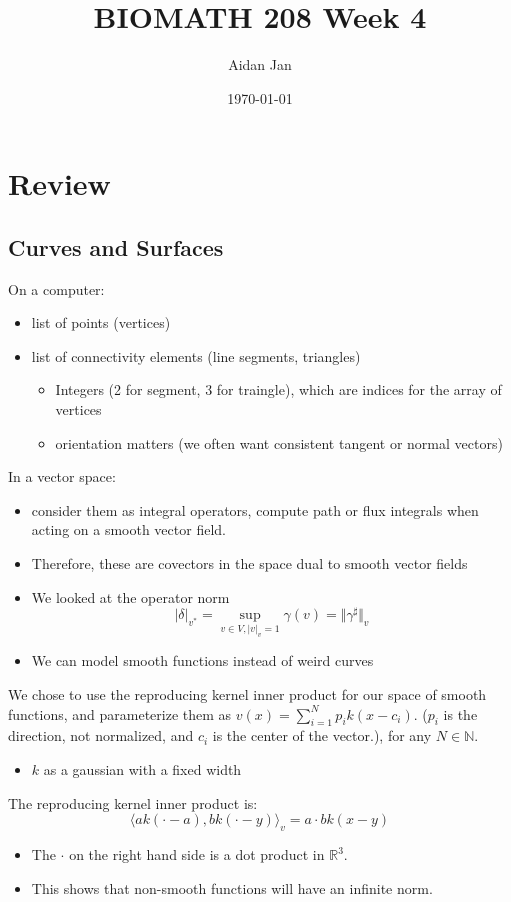 \documentclass[10pt]{article}
\title{BIOMATH 208 Week 4}
\author{Aidan Jan}
\date{\today}
\begin{document}
\maketitle
\section*{Review}
\subsection*{Curves and Surfaces}
On a computer:
\begin{itemize}
    \item list of points (vertices)
    \item list of connectivity elements (line segments, triangles)
    \begin{itemize}
        \item Integers (2 for segment, 3 for traingle), which are indices for the array of vertices
        \item orientation matters (we often want consistent tangent or normal vectors)
    \end{itemize}
\end{itemize}
In a vector space:
\begin{itemize}
    \item consider them as integral operators, compute path or flux integrals when acting on a smooth vector field.
    \item Therefore, these are covectors in the space dual to smooth vector fields
    \item We looked at the operator norm 
    \[|\delta|_{v^*} = \sup_{v \in V, |v|_v = 1} \gamma(v) = \Vert \gamma^\sharp \Vert_v\]    
    \item We can model smooth functions instead of weird curves
\end{itemize}
We chose to use the reproducing kernel inner product for our space of smooth functions, and parameterize them as $v(x) = \sum_{i = 1}^N p_i k(x - c_i)$.  ($p_i$ is the direction, not normalized, and $c_i$ is the center of the vector.), for any $N \in \mathbb{N}$.
\begin{itemize}
    \item $k$ as a gaussian with a fixed width 
\end{itemize}
The reproducing kernel inner product is:
\[\langle ak(\cdot - a), bk(\cdot - y) \rangle_v = a \cdot b k(x - y)\]
\begin{itemize}
    \item The $\cdot$ on the right hand side is a dot product in $\mathbb{R}^3$.
    \item This shows that non-smooth functions will have an infinite norm.
\end{itemize}
\end{document}
